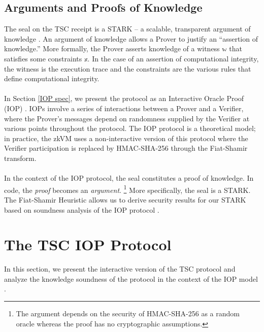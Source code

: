 \documentclass[10pt,letterpaper,titlepage]{article}
\theoremstyle{definition}
\begin{document}
\subsection{Arguments and Proofs of Knowledge} 
\label{arguments}
The seal on the TSC receipt is a STARK -- a scalable, transparent argument of knowledge \cite{stark}. 
An argument of knowledge allows a Prover to justify an ``assertion of knowledge.'' 
More formally, the Prover asserts knowledge of a witness $\mathbb{w}$ that satisfies some constraints $\mathbb{x}$. 
In the case of an assertion of computational integrity, the witness is the execution trace and the constraints are the various rules that define computational integrity. \\
\\
In Section \ref{IOP spec}, we present the protocol as an Interactive Oracle Proof (IOP) \cite{iop}.  
IOPs involve a series of interactions between a Prover and a Verifier, where the Prover's messages depend on randomness supplied by the Verifier at various points throughout the protocol. 
The IOP protocol is a theoretical model; in practice, the zkVM uses a non-interactive version of this protocol where the Verifier participation is replaced by HMAC-SHA-256 through the Fiat-Shamir transform.\\
\\
In the context of the IOP protocol, the seal constitutes a proof of knowledge. In code, the \textit{proof} becomes an \textit{argument}.%
\footnote{The argument depends on the security of HMAC-SHA-256 as a random oracle whereas the proof has no cryptographic assumptions.}
More specifically, the seal is a STARK. 
The Fiat-Shamir Heuristic allows us to derive security results for our STARK based on soundness analysis of the IOP protocol \cite{fiat-shamir}.

\section{The TSC IOP Protocol}
\label{iop}
In this section, we present the interactive version of the TSC protocol and analyze the knowledge soundness of the protocol in the context of the IOP model \cite{iop}. 
\end{document}

